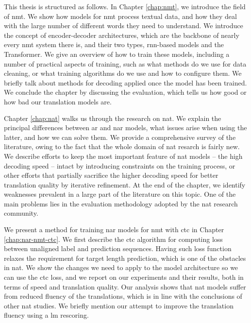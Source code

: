 

\vspace{\baselineskip}

This thesis is structured as follows.
%
In Chapter \ref{chap:nmt}, we introduce the field of \ac{nmt}. We show how
models for \ac{nmt} process textual data, and how they deal with the large
number of different words they need to understand. We introduce the concept of
encoder-decoder architectures, which are the backbone of nearly every \ac{nmt}
system there is, and their two types, \acs{rnn}-based models and the
Transformer. We give an overview of how to train these models, including a
number of practical aspects of training, such as what methods do we use for
data cleaning, or what training algorithms do we use and how to configure
them. We briefly talk about methods for decoding applied once the model has
been trained. We conclude the chapter by discussing the evaluation, which tells
us how good or how bad our translation models are.

Chapter \ref{chap:nat} walks us through the research on \ac{nat}. We explain
the principal differences between \acl{ar} and \acl{nar} models, what issues
arise when using the latter, and how we can solve them. We provide a
comprehensive survey of the literature, owing to the fact that the whole domain
of \ac{nat} resarch is fairly new. We describe efforts to keep the most
important feature of \ac{nat} models -- the high decoding speed -- intact by
introducing constraints on the training process, or other efforts that
partially sacrifice the higher decoding speed for better translation quality by
iterative refinement. At the end of the chapter, we identify weaknesses
prevalent in a large part of the literature on this topic. One of the main
problems lies in the evaluation methodology adopted by the \ac{nat} research
community.

We present a method for training \acl{nar} models for \ac{nmt} with \ac{ctc} in
Chapter \ref{chap:nar-nmt-ctc}. We first describe the \ac{ctc} algorithm for
computing loss between unaligned label and prediction sequences. Having such
loss function relaxes the requirement for target length prediction, which is
one of the obstacles in \ac{nat}. We show the changes we need to apply to the
model architecture so we can use the \ac{ctc} loss, and we report on our
experiments and their results, both in terms of speed and translation quality.
Our analysis shows that \ac{nat} models suffer from reduced fluency of the
translations, which is in line with the conclusions of other \ac{nat} studies.
We briefly mention our attempt to improve the translation fluency using a
\acl{lm} rescoring.

